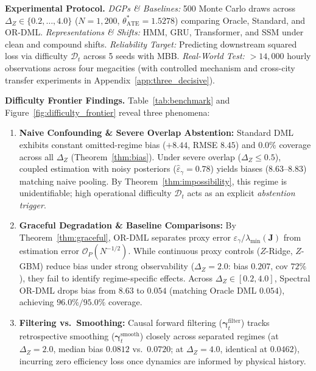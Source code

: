 \documentclass[twoside]{article}
\theoremstyle{definition}
\begin{document}
\textbf{Experimental Protocol.} \emph{DGPs \& Baselines:} 500 Monte Carlo draws across $\Delta_Z \in \{0.2, \dots, 4.0\}$ ($N=1,200$, $\theta_{\mathrm{ATE}}^* = 1.5278$) comparing Oracle, Standard, and OR-DML. \emph{Representations \& Shifts:} HMM, GRU, Transformer, and SSM under clean and compound shifts. \emph{Reliability Target:} Predicting downstream squared loss via difficulty $\mathcal{D}_t$ across 5 seeds with MBB. \emph{Real-World Test:} $>14,000$ hourly observations across four megacities (with controlled mechanism and cross-city transfer experiments in Appendix~\ref{app:three_decisive}).

\textbf{Difficulty Frontier Findings.} Table~\ref{tab:benchmark} and Figure~\ref{fig:difficulty_frontier} reveal three phenomena:
\begin{enumerate}\setlength{\itemsep}{-3pt}\setlength{\parskip}{0pt}
    \item \textbf{Naive Confounding \& Severe Overlap Abstention:} Standard DML exhibits constant omitted-regime bias ($+8.44$, RMSE $8.45$) and $0.0\%$ coverage across all $\Delta_Z$ (Theorem~\ref{thm:bias}). Under severe overlap ($\Delta_Z \le 0.5$), coupled estimation with noisy posteriors ($\hat{\varepsilon}_\gamma = 0.78$) yields biases ($8.63\text{--}8.83$) matching naive pooling. By Theorem~\ref{thm:impossibility}, this regime is unidentifiable; high operational difficulty $\mathcal{D}_t$ acts as an explicit \emph{abstention trigger}.
    \item \textbf{Graceful Degradation \& Baseline Comparisons:} By Theorem~\ref{thm:graceful}, OR-DML separates proxy error $\varepsilon_\gamma / \lambda_{\min}(\boldsymbol{J})$ from estimation error $\mathcal{O}_P(N^{-1/2})$. While continuous proxy controls ($Z$-Ridge, $Z$-GBM) reduce bias under strong observability ($\Delta_Z=2.0$: bias $0.207$, cov $72\%$), they fail to identify regime-specific effects. Across $\Delta_Z \in [0.2, 4.0]$, Spectral OR-DML drops bias from $8.63$ to $0.054$ (matching Oracle DML $0.054$), achieving $96.0\% / 95.0\%$ coverage.
    \item \textbf{Filtering vs.\ Smoothing:} Causal forward filtering ($\boldsymbol{\gamma}_t^{\mathrm{filter}}$) tracks retrospective smoothing ($\boldsymbol{\gamma}_t^{\mathrm{smooth}}$) closely across separated regimes (at $\Delta_Z = 2.0$, median bias $0.0812$ vs.\ $0.0720$; at $\Delta_Z = 4.0$, identical at $0.0462$), incurring zero efficiency loss once dynamics are informed by physical history.
\end{enumerate}
\end{document}
